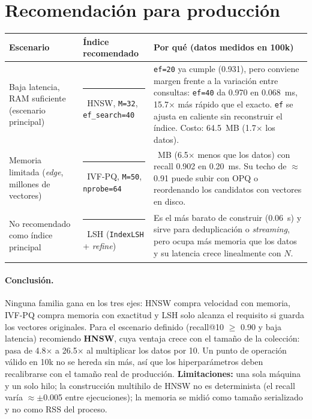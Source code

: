 \documentclass[10pt,a4paper]{article}
\newcommand{\famsq}[1]{\textcolor{c#1}{\rule{0.6em}{0.6em}}}
\begin{document}
\section{Recomendación para producción}

\begin{table}[H]
\centering\small
\begin{tabular}{@{}>{\raggedright\arraybackslash}p{3.3cm}>{\raggedright\arraybackslash}p{3.5cm}>{\raggedright\arraybackslash}p{9.9cm}@{}}
\toprule
\textbf{Escenario} & \textbf{Índice recomendado} & \textbf{Por qué (datos medidos en 100k)} \\
\midrule
Baja latencia, RAM suficiente (escenario principal) &
\famsq{HNSW}~HNSW, \texttt{M=32}, \texttt{ef\_search=40} &
\texttt{ef=20} ya cumple (0.931), pero conviene margen frente a la variación entre consultas:
\texttt{ef=40} da 0.970 en 0.068~ms, 15.7$\times$ más rápido que el exacto. \texttt{ef} se ajusta
en caliente sin reconstruir el índice. Costo: 64.5~MB (1.7$\times$ los datos). \\
\addlinespace
Memoria limitada (\emph{edge}, millones de vectores) &
\famsq{PQ}~IVF-PQ, \texttt{M=50}, \texttt{nprobe=64} &
5.9~MB (6.5$\times$ menos que los datos) con recall 0.902 en 0.20~ms. Su techo de $\approx$0.91
puede subir con OPQ o reordenando los candidatos con vectores en disco. \\
\addlinespace
No recomendado como índice principal &
\famsq{LSH}~LSH (\texttt{IndexLSH} + \emph{refine}) &
Es el más barato de construir (0.06~s) y sirve para deduplicación o \emph{streaming}, pero ocupa
más memoria que los datos y su latencia crece linealmente con $N$. \\
\bottomrule
\end{tabular}
\end{table}

\paragraph{Conclusión.} Ninguna familia gana en los tres ejes: HNSW compra velocidad con memoria,
IVF-PQ compra memoria con exactitud y LSH solo alcanza el requisito si guarda los vectores
originales. Para el escenario definido (recall@10 $\geq$ 0.90 y baja latencia) recomiendo
\textbf{HNSW}, cuya ventaja crece con el tamaño de la colección: pasa de 4.8$\times$ a 26.5$\times$
al multiplicar los datos por 10. Un punto de operación válido en 10k no se hereda sin más, así que
los hiperparámetros deben recalibrarse con el tamaño real de producción. \textbf{Limitaciones:} una
sola máquina y un solo hilo; la construcción multihilo de HNSW no es determinista (el recall varía
$\approx\pm$0.005 entre ejecuciones); la memoria se midió como tamaño serializado y no como RSS del
proceso.
\end{document}
